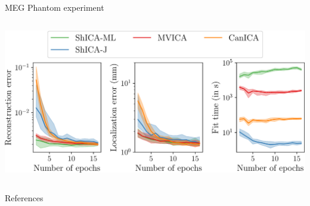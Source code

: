 \documentclass[final]{beamer}
\newlength{\onecolwid}
\newlength{\onecolwidthree}
\begin{document}
\begin{frame}[t]
\begin{columns}[t]
\begin{column}{\onecolwidthree}
\begin{block}{MEG Phantom experiment}
\begin{columns}
      \begin{column}{0.6 \textwidth}
    \begin{center}
      \includegraphics[width=1\textwidth]{./figures/meg_phantom_neurips.pdf}
    \end{center}
  \end{column}
    \end{columns}
  \end{block}





\begin{block}{References}
  \nocite{*} %
    \printbibliography

\end{block}

    


\end{column} %


\end{columns} %

\end{frame} %
\end{document}
